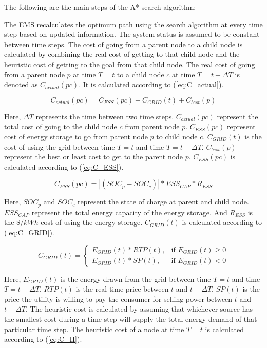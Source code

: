 The following are the main steps of the A* search algorithm:


The EMS recalculates the optimum path using the search algorithm at every time step based on updated information. The system status is assumed to be constant between time steps. The cost of going from a parent node to a child node is calculated by combining the real cost of getting to that child node and the heuristic cost of getting to the goal from that child node. The real cost of going from a parent node $p$ at time $T=t$ to a child node $c$ at time $T=t+\Delta T$ is denoted as $C_{actual}(pc)$. It is calculated according to (\ref{eq:C_actual}).

\begin{equation}
\label{eq:C_actual}
    C_{actual}(pc) =  C_{ESS}(pc)+C_{GRID}(t)+C_{best}(p)
\end{equation}

Here, $\Delta T$ represents the time between two time steps. $C_{actual}(pc)$ represent the total cost of going to the child node $c$ from parent node $p$. $C_{ESS}(pc)$ represent cost of energy storage to go from parent node $p$ to child node $c$. $C_{GRID}(t)$ is the cost of using the grid between time $T=t$ and time $T=t+\Delta T$. $C_{best}(p)$ represent the best or least cost to get to the parent node $p$. $C_{ESS}(pc)$ is calculated according to (\ref{eq:C_ESS}).

\begin{equation}
\label{eq:C_ESS}
C_{ESS}(pc) = |(SOC_p - SOC_c)|*ESS_{CAP}*R_{ESS} 
\end{equation}

Here, $SOC_p$ and $SOC_c$ represent the state of charge at parent and child node. $ESS_{CAP}$ represent the total energy capacity of the energy storage. And $R_{ESS}$ is the $\$/kWh$ cost of using the energy storage. $C_{GRID}(t)$ is calculated according to (\ref{eq:C_GRID}).

\begin{equation}
\label{eq:C_GRID}
C_{GRID}(t) = 
\begin{cases}
   E_{GRID}(t)*RTP(t),& \text{if } E_{GRID}(t)\geq 0\\
    E_{GRID}(t)*SP(t),& \text{if }  E_{GRID}(t) < 0
\end{cases}
\end{equation}

Here, $E_{GRID}(t)$ is the energy drawn from the grid between time $T=t$ and time $T=t+\Delta T$. $RTP(t)$ is the real-time price between $t$ and $t+\Delta T$. $SP(t)$ is the price the utility is willing to pay the consumer for selling power between $t$ and $t+\Delta T$. The heuristic cost is calculated by assuming that whichever source has the smallest cost during a time step will supply the total energy demand of that particular time step. The heuristic cost of a node at time $T = t$ is calculated according to (\ref{eq:C_H}).


